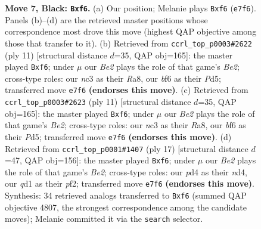 \documentclass[11pt]{article}
\begin{document}
\begin{figure}[p]
\caption{\textbf{Move 7, Black: \texttt{Bxf6}.} (a) Our position; Melanie plays \texttt{Bxf6} (\texttt{e7f6}). Panels (b)--(d) are the retrieved master positions whose correspondence most drove this move (highest QAP objective among those that transfer to it). (b) Retrieved from \texttt{ccrl\_top\_p0003\#2622} (ply 11) [structural distance $d$=35, QAP obj=165]: the master played \texttt{Bxf6}; under $\mu$ our \emph{Be2} plays the role of that game's \emph{Be2}; cross-type roles: our \emph{n}c3 as their \emph{R}a8, our \emph{b}f6 as their \emph{P}d5; transferred move \texttt{e7f6} \textbf{(endorses this move)}. (c) Retrieved from \texttt{ccrl\_top\_p0003\#2623} (ply 11) [structural distance $d$=35, QAP obj=165]: the master played \texttt{Bxf6}; under $\mu$ our \emph{Be2} plays the role of that game's \emph{Be2}; cross-type roles: our \emph{n}c3 as their \emph{R}a8, our \emph{b}f6 as their \emph{P}d5; transferred move \texttt{e7f6} \textbf{(endorses this move)}. (d) Retrieved from \texttt{ccrl\_top\_p0001\#1407} (ply 17) [structural distance $d$=47, QAP obj=156]: the master played \texttt{Bxf6}; under $\mu$ our \emph{Be2} plays the role of that game's \emph{Be2}; cross-type roles: our \emph{p}d4 as their \emph{n}d4, our \emph{q}d1 as their \emph{p}f2; transferred move \texttt{e7f6} \textbf{(endorses this move)}. Synthesis: 34 retrieved analogs transferred to \texttt{Bxf6} (summed QAP objective 4807, the strongest correspondence among the candidate moves); Melanie committed it via the \texttt{search} selector.}
\label{fig:thought-m13}
\end{figure}

\clearpage
\end{document}
